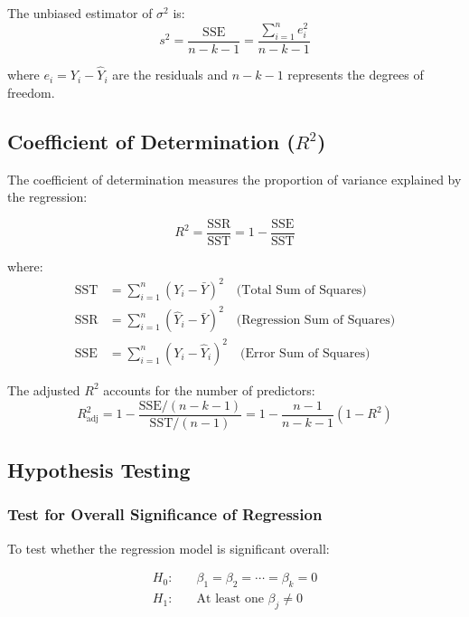 \documentclass[twoside]{book}
\begin{document}
The unbiased estimator of $\sigma^2$ is:
\begin{equation}
s^2 = \frac{\text{SSE}}{n-k-1} = \frac{\sum_{i=1}^{n} e_i^2}{n-k-1}
\end{equation}

where $e_i = Y_i - \hat{Y}_i$ are the residuals and $n-k-1$ represents the degrees of freedom.

\subsection{Coefficient of Determination ($R^2$)}

The coefficient of determination measures the proportion of variance explained by the regression:

\begin{equation}
R^2 = \frac{\text{SSR}}{\text{SST}} = 1 - \frac{\text{SSE}}{\text{SST}}
\end{equation}

where:
\begin{align}
\text{SST} &= \sum_{i=1}^{n} (Y_i - \bar{Y})^2 \quad \text{(Total Sum of Squares)} \\
\text{SSR} &= \sum_{i=1}^{n} (\hat{Y}_i - \bar{Y})^2 \quad \text{(Regression Sum of Squares)} \\
\text{SSE} &= \sum_{i=1}^{n} (Y_i - \hat{Y}_i)^2 \quad \text{(Error Sum of Squares)}
\end{align}

The adjusted $R^2$ accounts for the number of predictors:
\begin{equation}
R^2_{\text{adj}} = 1 - \frac{\text{SSE}/(n-k-1)}{\text{SST}/(n-1)} = 1 - \frac{n-1}{n-k-1}(1-R^2)
\end{equation}

\subsection{Hypothesis Testing}

\subsubsection{Test for Overall Significance of Regression}

To test whether the regression model is significant overall:

\begin{align}
H_0: &\quad \beta_1 = \beta_2 = \cdots = \beta_k = 0 \\
H_1: &\quad \text{At least one } \beta_j \neq 0
\end{align}
\end{document}
